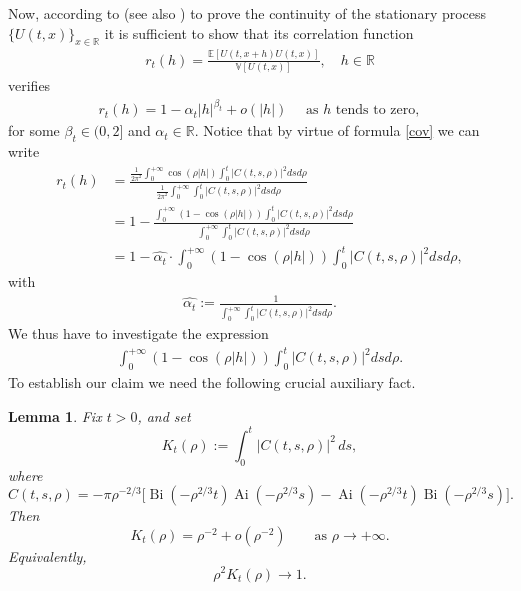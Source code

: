 \documentclass{article}
\newcommand{\Ai}{\operatorname{Ai}}
\newcommand{\Bi}{\operatorname{Bi}}
\newtheorem{lemma}[theorem]{Lemma}
\begin{document}
Now, according to \cite{Orsingher} (see also \cite{Pickands}) to prove the continuity of the stationary process $\{U(t,x)\}_{x\in\mathbb{R}}$ it is sufficient to show that its correlation function
\begin{align*}
r_t(h)=\frac{\mathbb{E}[U(t,x+h)U(t,x)]}{\mathbb{V}[U(t,x)]},\quad h\in\mathbb{R}
\end{align*} 
verifies 
\begin{align}\label{r}
r_t(h)=1-\alpha_t|h|^{\beta_t}+o(|h|)\quad\mbox{ as $h$ tends to zero},
\end{align}
for some $\beta_t\in(0,2]$ and $\alpha_t\in\mathbb{R}$. Notice that by virtue of formula \eqref{cov} we can write
\begin{align*}
r_t(h)&=\frac{\frac{1}{2\pi^2}\int_0^{+\infty}\cos(\rho |h|)\int_0^t|C(t,s,\rho)|^2dsd\rho}{\frac{1}{2\pi^2}\int_0^{+\infty}\int_0^t|C(t,s,\rho)|^2dsd\rho}\\
&=1-\frac{\int_0^{+\infty}(1-\cos(\rho |h|))\int_0^t|C(t,s,\rho)|^2dsd\rho}{\int_0^{+\infty}\int_0^t|C(t,s,\rho)|^2dsd\rho}\\
&=1-\hat{\alpha_t}\cdot\int_0^{+\infty}(1-\cos(\rho |h|))\int_0^t|C(t,s,\rho)|^2dsd\rho,
\end{align*}
with
\begin{align*}
\hat{\alpha_t}:=\frac{1}{\int_0^{+\infty}\int_0^t|C(t,s,\rho)|^2dsd\rho}.
\end{align*}
We thus have to investigate the expression
\begin{align*}
\int_0^{+\infty}(1-\cos(\rho |h|))\int_0^t|C(t,s,\rho)|^2dsd\rho.
\end{align*}
To establish our claim we need the following crucial auxiliary fact.

\begin{lemma}\label{as}
Fix \(t>0\), and set
\[
  K_t(\rho):=\int_0^t |C(t,s,\rho)|^2\,ds ,
\]
where
\[
C(t,s,\rho)
=
-\pi\rho^{-2/3}
\Big[
 \Bi(-\rho^{2/3}t)\Ai(-\rho^{2/3}s)
 -
 \Ai(-\rho^{2/3}t)\Bi(-\rho^{2/3}s)
\Big].
\]
Then
\[
  K_t(\rho)=\rho^{-2}+o(\rho^{-2})
  \qquad \text{as } \rho\to+\infty.
\]
Equivalently,
\[
  \rho^2K_t(\rho)\longrightarrow 1 .
\]
\end{lemma}
\end{document}
